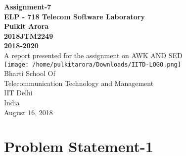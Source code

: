 \documentclass[a4paper,12pt]{article}
\begin{document}
\begin{center}
\textbf{Assignment-7 \\
\vspace{5mm}
ELP - 718 Telecom Software Laboratory \\
\vspace{2mm}
Pulkit Arora\\
2018JTM2249 \\
2018-2020} \\
\vspace{10mm}
A report presented for the assignment on AWK AND SED\\
\vspace{20mm}
\texttt{[image: /home/pulkitarora/Downloads/IITD-LOGO.png]} \\
\vspace{10mm}
Bharti School Of \\
Telecommunication Technology and Management \\
IIT Delhi \\
India \\
August 16, 2018\\
\tableofcontents
\newpage
\end{center}
\section{Problem Statement-1}
\end{document}
